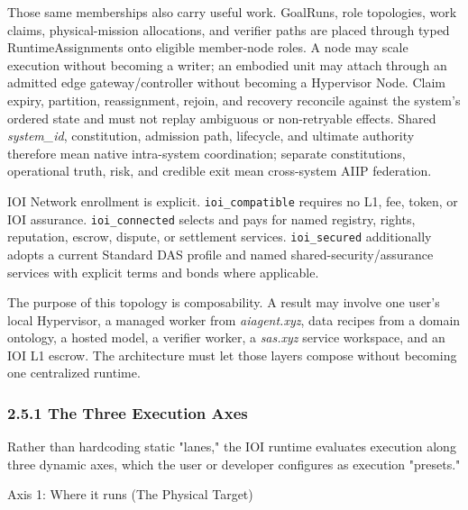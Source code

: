 \documentclass[
  11pt,
]{article}
\begin{document}
Those same memberships also carry useful work. GoalRuns, role topologies,
work claims, physical-mission allocations, and verifier paths are placed through typed
RuntimeAssignments onto eligible member-node roles. A node may scale execution
without becoming a writer; an embodied unit may attach through an admitted edge
gateway/controller without becoming a Hypervisor Node. Claim expiry, partition,
reassignment, rejoin, and recovery reconcile against the system's ordered state
and must not replay ambiguous or non-retryable effects. Shared \emph{system\_id},
constitution, admission path, lifecycle, and ultimate authority therefore mean
native intra-system coordination; separate constitutions, operational truth,
risk, and credible exit mean cross-system AIIP federation.

IOI Network enrollment is explicit. \texttt{ioi\_compatible} requires no L1,
fee, token, or IOI assurance. \texttt{ioi\_connected} selects and pays for
named registry, rights, reputation, escrow, dispute, or settlement services.
\texttt{ioi\_secured} additionally adopts a current Standard DAS profile and
named shared-security/assurance services with explicit terms and bonds where
applicable.

The purpose of this topology is composability. A result may involve one
user's local Hypervisor, a managed worker from \emph{aiagent.xyz}, data
recipes from a domain ontology, a hosted model, a verifier worker, a
\emph{sas.xyz} service workspace, and an IOI L1 escrow. The architecture
must let those layers compose without becoming one centralized runtime.

\hypertarget{the-three-execution-axes}{%
\subsubsection{2.5.1 The Three Execution
Axes}\label{the-three-execution-axes}}

Rather than hardcoding static "lanes," the IOI runtime evaluates
execution along three dynamic axes, which the user or developer
configures as execution "presets."

Axis 1: Where it runs (The Physical Target)
\end{document}
